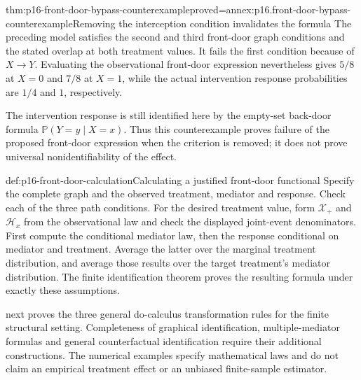 \begin{hbtheorem}{thm:p16-front-door-bypass-counterexample}{proved=annex:p16.front-door-bypass-counterexample}{Removing the interception condition invalidates the formula}
The preceding model satisfies the second and third front-door graph
conditions and the stated overlap at both treatment values. It fails
the first condition because of \(X\to Y\). Evaluating the
observational front-door expression nevertheless gives \(5/8\) at
\(X=0\) and \(7/8\) at \(X=1\), while the actual intervention
response probabilities are \(1/4\) and \(1\), respectively.

The intervention response is still identified here by the empty-set
back-door formula \(\mathbb P(Y=y\mid X=x)\). Thus this
counterexample proves failure of the proposed front-door expression
when the criterion is removed; it does not prove universal
nonidentifiability of the effect.
\end{hbtheorem}

\begin{hbmethod}{def:p16-front-door-calculation}{Calculating a justified front-door functional}
Specify the complete graph and the observed treatment, mediator and
response. Check each of the three path conditions. For the desired
treatment value, form \(\mathcal X_+\) and \(\mathcal H_x\)
from the observational law and check the displayed joint-event
denominators. First compute the conditional mediator law, then the
response conditional on mediator and treatment. Average the latter
over the marginal treatment distribution, and average those results
over the target treatment's mediator distribution. The finite
identification theorem proves the resulting formula under exactly
these assumptions.
\end{hbmethod}

 next proves the three general
do-calculus transformation rules for the finite structural setting.
Completeness of graphical identification, multiple-mediator formulas
and general counterfactual identification require their additional
constructions. The numerical examples specify mathematical laws and
do not claim an empirical treatment effect or an unbiased finite-sample
estimator.

